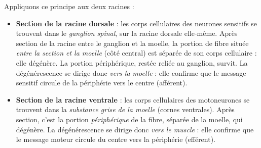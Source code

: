 \documentclass[11pt]{article}
\begin{document}
Appliquons ce principe aux deux racines :

\begin{itemize}
\item \textbf{Section de la racine dorsale} : les corps cellulaires des neurones sensitifs se trouvent dans le \emph{ganglion spinal}, sur la racine dorsale elle-même. Après section de la racine entre le ganglion et la moelle, la portion de fibre située \emph{entre la section et la moelle} (côté central) est séparée de son corps cellulaire : elle dégénère. La portion périphérique, restée reliée au ganglion, survit. La dégénérescence se dirige donc \emph{vers la moelle} : elle confirme que le message sensitif circule de la périphérie vers le centre (afférent).
\item \textbf{Section de la racine ventrale} : les corps cellulaires des motoneurones se trouvent dans la \emph{substance grise de la moelle} (cornes ventrales). Après section, c'est la portion \emph{périphérique} de la fibre, séparée de la moelle, qui dégénère. La dégénérescence se dirige donc \emph{vers le muscle} : elle confirme que le message moteur circule du centre vers la périphérie (efférent).
\end{itemize}
\end{document}
